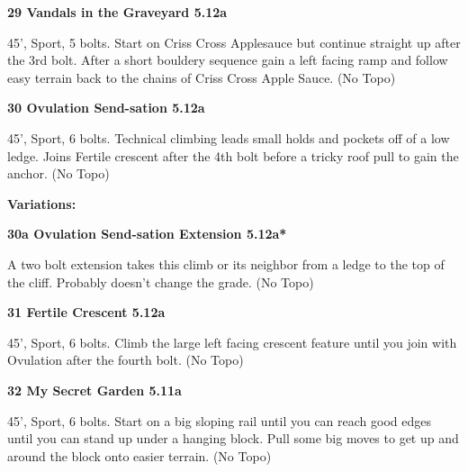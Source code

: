 \begin{multicols}{2}
\needspace{1.5cm}
\label{rt:Vandals in the Graveyard}
\colorbox{Goldenrod!50}{
\parbox{0.95\linewidth}{
\textbf{
29 Vandals in the Graveyard 5.12a  
}}}
\begin{adjustwidth}{0.5cm}{}			
45', Sport, 5 bolts. Start on Criss Cross Applesauce but continue straight up after the 3rd bolt. After a short bouldery sequence gain a left facing ramp and follow easy terrain back to the chains of Criss Cross Apple Sauce.
  (No Topo)
\end{adjustwidth}




\needspace{1.5cm}
\label{rt:Ovulation Send-sation}
\colorbox{Goldenrod!50}{
\parbox{0.95\linewidth}{
\textbf{
30 Ovulation Send-sation 5.12a  
}}}
\begin{adjustwidth}{0.5cm}{}			
45', Sport, 6 bolts. Technical climbing leads small holds and pockets off of a low ledge. Joins Fertile crescent after the 4th bolt before a tricky roof pull to gain the anchor.
  (No Topo)
\end{adjustwidth}


\begin{adjustwidth}{0.5cm}{}				
\needspace{3cm}
\textbf{Variations:} \newline

\needspace{1.5cm}
\label{vr:Ovulation Send-sation Extension}
\colorbox{Goldenrod!50}{
\parbox{0.95\linewidth}{
\textbf{
30a Ovulation Send-sation Extension 5.12a*  
}}}
\begin{adjustwidth}{0.5cm}{}			
A two bolt extension takes this climb or its neighbor from a ledge to the top of the cliff. Probably doesn't change the grade.
  (No Topo)
\end{adjustwidth}



\end{adjustwidth}


\needspace{1.5cm}
\label{rt:Fertile Crescent}
\colorbox{Goldenrod!50}{
\parbox{0.95\linewidth}{
\textbf{
31 Fertile Crescent 5.12a  
}}}
\begin{adjustwidth}{0.5cm}{}			
45', Sport, 6 bolts. Climb the large left facing crescent feature until you join with Ovulation after the fourth bolt.
  (No Topo)
\end{adjustwidth}




\needspace{1.5cm}
\label{rt:My Secret Garden}
\colorbox{RoyalBlue!20}{
\parbox{0.95\linewidth}{
\textbf{
32 My Secret Garden 5.11a  
}}}
\begin{adjustwidth}{0.5cm}{}			
45', Sport, 6 bolts. Start on a big sloping rail until you can reach good edges until you can stand up under a hanging block. Pull some big moves to get up and around the block onto easier terrain.
  (No Topo)
\end{adjustwidth}





\end{multicols}

